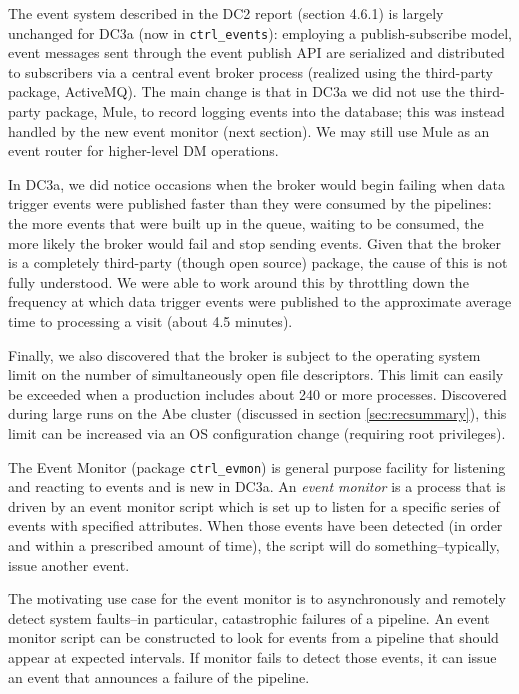  \label{sec:events}

The event system described in the DC2 report (section 4.6.1) is
largely unchanged for DC3a (now in {\tt ctrl\_events}):  employing a
publish-subscribe model, event messages sent through the event publish
API are serialized and distributed to subscribers via a central event
broker process (realized using the third-party package, ActiveMQ).
The main change is that in DC3a we did not use the third-party
package, Mule, to record logging events into the database; this was
instead handled by the new event monitor (next section).  We may still
use Mule as an event router for higher-level DM operations.   

\label{brokerprob} In DC3a, we did notice occasions when the
broker would begin failing when data trigger events were published
faster than they were consumed by the pipelines:  the more events that
were built up in the queue, waiting to be consumed, the more likely
the broker would fail and stop sending events.  Given that the broker
is a completely third-party (though open source) package, the cause of
this is not fully understood.  We were able to work around this by
throttling down the frequency at which data trigger events were
published to the approximate average time to processing a visit (about
4.5 minutes).  

Finally, we also discovered that the broker is subject to the
operating system limit on the number of simultaneously open file
descriptors.  This limit can easily be exceeded when a production
includes about 240 or more processes.  Discovered during large runs on
the Abe cluster (discussed in section \ref{sec:recsummary}), this
limit can be increased via an OS configuration change (requiring root
privileges).  

 \label{sec:evmon}

The Event Monitor (package {\tt ctrl\_evmon}) is general purpose
facility for listening and reacting to events and is new in DC3a.  An
{\it event monitor} is a process that is driven by an event monitor
script which is set up to listen for a specific series of events with
specified attributes.  When those events have been detected (in order
and within a prescribed amount of time), the script will do
something--typically, issue another event.  

The motivating use case for the event monitor is to asynchronously and
remotely detect system faults--in particular, catastrophic failures of
a pipeline.  An event monitor script can be constructed to look for
events from a pipeline that should appear at expected intervals.  If
monitor fails to detect those events, it can issue an event that
announces a failure of the pipeline.

